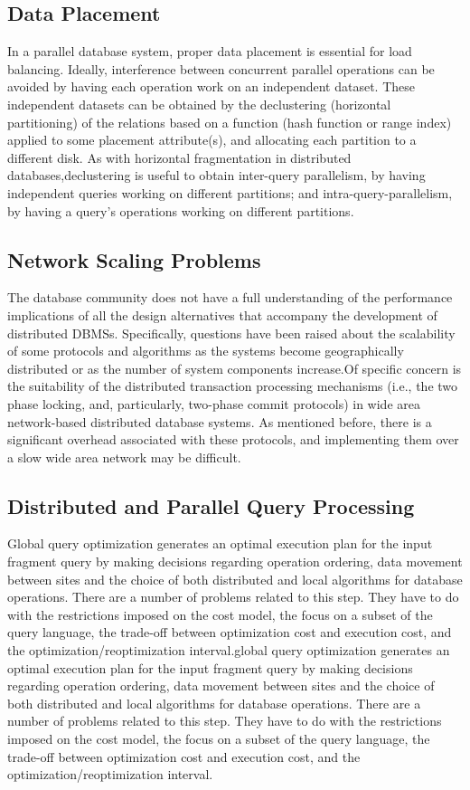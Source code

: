 \documentclass{article}
\begin{document}
\subsection{Data Placement}
In a parallel database system, proper data placement is essential for load balancing. Ideally, interference between concurrent parallel operations can be avoided by having each operation work on an independent dataset. These independent datasets can be obtained by the declustering (horizontal partitioning) of the relations based on a function (hash function or range index) applied to some placement attribute(s), and allocating each partition to a different disk. As with horizontal fragmentation in distributed databases,declustering is useful to obtain inter-query parallelism, by having independent queries working on different partitions; and intra-query-parallelism, by having a query’s operations working on different partitions.

\subsection{Network Scaling Problems}
The database community does not have a full understanding of the performance implications of all the design alternatives that accompany the development of distributed DBMSs. Specifically, questions have been raised about the scalability of some protocols and algorithms as the systems become geographically distributed or as the number of system components increase.Of specific concern is the suitability of the distributed transaction processing mechanisms (i.e., the two phase locking, and, particularly, two-phase commit protocols) in wide area network-based distributed database systems. As mentioned before, there is a significant overhead associated with these protocols, and implementing them over a slow wide area network may be difficult.

\subsection{Distributed and Parallel Query Processing}
Global query optimization generates an optimal execution plan for the input fragment query by making decisions regarding operation ordering, data movement between sites and the choice of both distributed and local algorithms for database operations. There are a number of problems related to this step. They have to do with the restrictions imposed on the cost model, the focus on a subset of the query language, the trade-off between optimization cost and execution cost, and the optimization/reoptimization interval.global query optimization generates an optimal execution plan for the input fragment query by making decisions regarding operation ordering, data movement between sites and the choice of both distributed and local algorithms for database operations. There are a number of problems related to this step. They have to do with the restrictions imposed on the cost model, the focus on a subset of the query language, the trade-off between optimization cost and execution cost, and the optimization/reoptimization interval.
\end{document}
